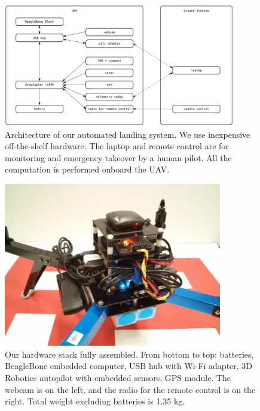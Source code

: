 \documentclass[10pt, twocolumn]{scrartcl} %
\begin{document}

\clearpage

\begin{figure}[h!]
\centering
\includegraphics[width=0.9\textwidth]{images/architecture.png}
\caption{
    Architecture of our automated landing system. We use inexpensive
    off-the-shelf hardware. The laptop and remote control are for
    monitoring and emergency takeover by a human pilot. All the
    computation is performed onboard the UAV.
}
\label{fig:hardware-arch}
\end{figure}

\begin{figure}[h!]
\centering
\includegraphics[width=0.85\textwidth]{images/hardware.jpg}
\caption{
    Our hardware stack fully assembled. From bottom to top: batteries,
    BeagleBone embedded computer, USB hub with Wi-Fi adapter, 3D
    Robotics autopilot with embedded sensors, GPS module. The
    webcam is on the left, and the radio for the remote control is on
    the right. Total weight excluding batteries is 1.35 kg.
}
\label{fig:hardware-photo}
\end{figure}
\end{document}
